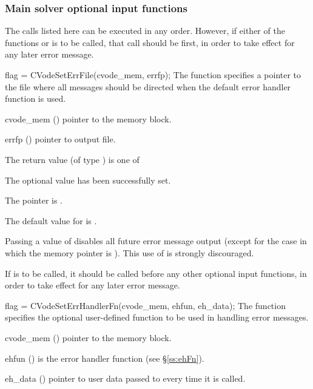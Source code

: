 \subsubsection{Main solver optional input functions}\label{sss:optin_main}

The calls listed here can be executed in any order.
However, if either of the functions  or
 is to be called, that call should be first,
in order to take effect for any later error message.

{
flag = CVodeSetErrFile(cvode\_mem, errfp);
}
{
  The function  specifies a pointer to the file
  where all {\cvode} messages should be directed when the default
  {\cvode} error handler function is used.
}
{
  \begin{args}
  \item[cvode\_mem] ()
    pointer to the {\cvode} memory block.
  \item[errfp] ()
    pointer to output file.
  \end{args}
}
{
  The return value  (of type ) is one of
  \begin{args}
  \item[\Id{CV\_SUCCESS}]
    The optional value has been successfully set.
  \item[\Id{CV\_MEM\_NULL}]
    The  pointer is .
  \end{args}
}
{
  The default value for  is .

  Passing a value of  disables all future error message output
  (except for the case in which the {\cvode} memory pointer is ).
  This use of  is strongly discouraged.

  {\warn}If  is to be called, it should be called before any
  other optional input functions, in order to take effect for any later error message.
}
{
flag = CVodeSetErrHandlerFn(cvode\_mem, ehfun, eh\_data);
}
{
  The function  specifies the optional user-defined function
  to be used in handling error messages.
}
{
  \begin{args}
  \item[cvode\_mem] ()
    pointer to the {\cvode} memory block.
  \item[ehfun] ()
    is the {\CC} error handler function (see \S\ref{ss:ehFn}).
  \item[eh\_data] ()
    pointer to user data passed to  every time it is called.
  \end{args}
}
